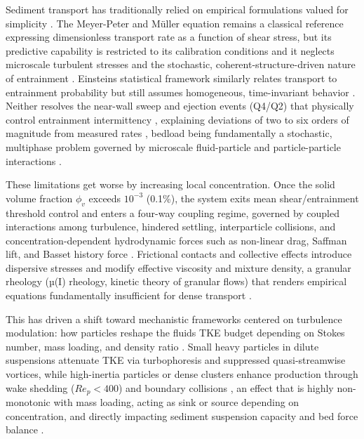 Sediment transport has traditionally relied on empirical formulations valued for simplicity \cite{vanrijn__1984,yalin__1977}. The Meyer-Peter and Müller \cite{meyer-peter__1948} equation remains a classical reference expressing dimensionless transport rate as a function of shear stress, but its predictive capability is restricted to its calibration conditions and it neglects microscale turbulent stresses and the stochastic, coherent-structure-driven nature of entrainment \cite{ancey__2020,PEND_Lee1994,PEND_Wiberg1985}. Einstein\textquotesingle s \cite{einstein__1950} statistical framework similarly relates transport to entrainment probability but still assumes homogeneous, time-invariant behavior \cite{ancey__2020,PEND_Furbish2016}. Neither resolves the near-wall sweep and ejection events (Q4/Q2) that physically control entrainment intermittency \cite{PEND_Baker2021,PEND_Nio1994,PEND_Nio1996,PEND_Nio1998,zhou__2020}, explaining deviations of two to six orders of magnitude from measured rates \cite{ancey__2020,chassagne__2020,wong__2006}, bedload being fundamentally a stochastic, multiphase problem governed by microscale fluid-particle and particle-particle interactions \cite{balachandar__2010,PEND_Chen2024,PEND_Schmeeckle2014,yamamoto__2001}.

These limitations get worse by increasing local concentration. Once the solid volume fraction \(\phi_{v}\) exceeds \(10^{- 3}\) (0.1\%), the system exits mean shear/entrainment threshold control and enters a four-way coupling regime, governed by coupled interactions among turbulence, hindered settling, interparticle collisions, and concentration-dependent hydrodynamic forces such as non-linear drag, Saffman lift, and Basset history force \cite{balachandar__2010,elghobashi__1994,PEND_Elghobashi2006,PEND_Mesa2021,moreno-casas__2022}. Frictional contacts and collective effects introduce dispersive stresses and modify effective viscosity and mixture density, a granular rheology (µ(I) rheology, kinetic theory of granular flows) that renders empirical equations fundamentally insufficient for dense transport \cite{ancey__2020,chassagne__2020,PEND_Nio1994}.

This has driven a shift toward mechanistic frameworks centered on turbulence modulation: how particles reshape the fluid\textquotesingle s TKE budget depending on Stokes number, mass loading, and density ratio \cite{capecelatro__2013,PEND_Crowe2012,gao__2023}. Small heavy particles in dilute suspensions attenuate TKE via turbophoresis and suppressed quasi-streamwise vortices, while high-inertia particles or dense clusters enhance production through wake shedding (\(Re_{p} < 400\)) and boundary collisions \cite{PEND_Brandt2021,brandt__2022,elghobashi__1994,PEND_Elghobashi2006,PEND_Lee2015,PEND_Liu2022}, an effect that is highly non-monotonic with mass loading, acting as sink or source depending on concentration, and directly impacting sediment suspension capacity and bed force balance \cite{guta__2024,zhou__2020}.

